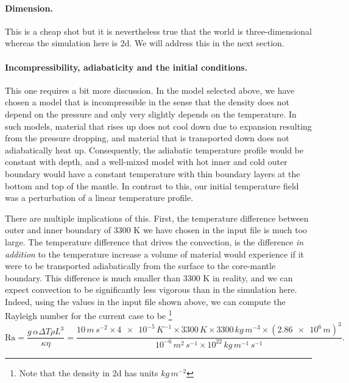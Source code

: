\documentclass{article}
\begin{document}
\paragraph{Dimension.} This is a cheap shot but it is nevertheless true that the
world is three-dimensional whereas the simulation here is 2d. We will address
this in the next section.

\paragraph{Incompressibility, adiabaticity and the initial conditions.} This one
requires a bit more discussion. In the model selected above, we have chosen a
model that is incompressible in the sense that the density does not depend on
the pressure and only very slightly depends on the temperature.
In such models, material that rises up does not cool down due to
expansion resulting from the pressure dropping, and material that is transported
down does not adiabatically heat up. Consequently, the adiabatic temperature
profile would be constant with depth, and a well-mixed model with hot inner and
cold outer boundary would have a constant temperature with thin boundary layers
at the bottom and top of the mantle. In contrast to this, our initial
temperature field was a perturbation of a linear temperature profile.

There are multiple implications of this. First, the temperature difference
between outer and inner boundary of 3300 K we have chosen in the input file is
much too large. The temperature difference that drives the convection,
is the difference \textit{in addition} to the temperature increase a volume of
material would experience if it were to be
transported adiabatically from the surface to the core-mantle boundary. This
difference is much smaller than 3300 K in reality, and we can expect convection
to be significantly less vigorous than in the simulation here. Indeed, using
the values in the input file shown above, we can compute the Rayleigh number for
the current case to be%
\footnote{Note that the density in 2d has units $\si{kg}\,\si{m}^{-2}$}
\begin{equation*}
  \textrm{Ra}
  =
  \frac{g\, \alpha  \Delta T  \rho  L^3}{\kappa\eta}
=
  \frac{10\, \si{m}\,\si{s}^{-2} \times \num{4e-5}\, \si{K}^{-1} \times 3300\,
  \si{K} \times 3300\, \si{kg}\,\si{m}^{-3} \times (\num{2.86e6}
  \, \si{m})^3}{10^{-6}\, \si{m}^2\,\si{s}^{-1}\times 10^{22}\,
  \si{kg}\,\si{m}^{-1}\,\si{s}^{-1}}.
\end{equation*}
\end{document}
